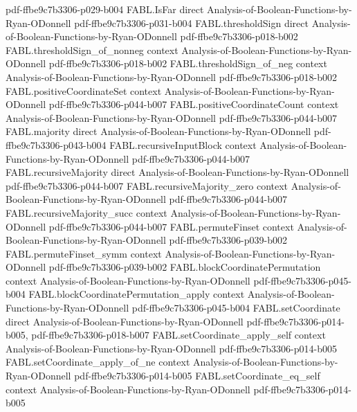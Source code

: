 \begin{theorem}
  {pdf-ffbe9c7b3306-p029-b004}
\proofstep
  {FABL.IsFar}
  {direct}
  {Analysis-of-Boolean-Functions-by-Ryan-ODonnell}
  {pdf-ffbe9c7b3306-p031-b004}
\proofstep
  {FABL.thresholdSign}
  {direct}
  {Analysis-of-Boolean-Functions-by-Ryan-ODonnell}
  {pdf-ffbe9c7b3306-p018-b002}
\proofstep
  {FABL.thresholdSign_of_nonneg}
  {context}
  {Analysis-of-Boolean-Functions-by-Ryan-ODonnell}
  {pdf-ffbe9c7b3306-p018-b002}
\proofstep
  {FABL.thresholdSign_of_neg}
  {context}
  {Analysis-of-Boolean-Functions-by-Ryan-ODonnell}
  {pdf-ffbe9c7b3306-p018-b002}
\proofstep
  {FABL.positiveCoordinateSet}
  {context}
  {Analysis-of-Boolean-Functions-by-Ryan-ODonnell}
  {pdf-ffbe9c7b3306-p044-b007}
\proofstep
  {FABL.positiveCoordinateCount}
  {context}
  {Analysis-of-Boolean-Functions-by-Ryan-ODonnell}
  {pdf-ffbe9c7b3306-p044-b007}
\proofstep
  {FABL.majority}
  {direct}
  {Analysis-of-Boolean-Functions-by-Ryan-ODonnell}
  {pdf-ffbe9c7b3306-p043-b004}
\proofstep
  {FABL.recursiveInputBlock}
  {context}
  {Analysis-of-Boolean-Functions-by-Ryan-ODonnell}
  {pdf-ffbe9c7b3306-p044-b007}
\proofstep
  {FABL.recursiveMajority}
  {direct}
  {Analysis-of-Boolean-Functions-by-Ryan-ODonnell}
  {pdf-ffbe9c7b3306-p044-b007}
\proofstep
  {FABL.recursiveMajority_zero}
  {context}
  {Analysis-of-Boolean-Functions-by-Ryan-ODonnell}
  {pdf-ffbe9c7b3306-p044-b007}
\proofstep
  {FABL.recursiveMajority_succ}
  {context}
  {Analysis-of-Boolean-Functions-by-Ryan-ODonnell}
  {pdf-ffbe9c7b3306-p044-b007}
\proofstep
  {FABL.permuteFinset}
  {context}
  {Analysis-of-Boolean-Functions-by-Ryan-ODonnell}
  {pdf-ffbe9c7b3306-p039-b002}
\proofstep
  {FABL.permuteFinset_symm}
  {context}
  {Analysis-of-Boolean-Functions-by-Ryan-ODonnell}
  {pdf-ffbe9c7b3306-p039-b002}
\proofstep
  {FABL.blockCoordinatePermutation}
  {context}
  {Analysis-of-Boolean-Functions-by-Ryan-ODonnell}
  {pdf-ffbe9c7b3306-p045-b004}
\proofstep
  {FABL.blockCoordinatePermutation_apply}
  {context}
  {Analysis-of-Boolean-Functions-by-Ryan-ODonnell}
  {pdf-ffbe9c7b3306-p045-b004}
\proofstep
  {FABL.setCoordinate}
  {direct}
  {Analysis-of-Boolean-Functions-by-Ryan-ODonnell}
  {pdf-ffbe9c7b3306-p014-b005,
    pdf-ffbe9c7b3306-p018-b007}
\proofstep
  {FABL.setCoordinate_apply_self}
  {context}
  {Analysis-of-Boolean-Functions-by-Ryan-ODonnell}
  {pdf-ffbe9c7b3306-p014-b005}
\proofstep
  {FABL.setCoordinate_apply_of_ne}
  {context}
  {Analysis-of-Boolean-Functions-by-Ryan-ODonnell}
  {pdf-ffbe9c7b3306-p014-b005}
\proofstep
  {FABL.setCoordinate_eq_self}
  {context}
  {Analysis-of-Boolean-Functions-by-Ryan-ODonnell}
  {pdf-ffbe9c7b3306-p014-b005}

\end{theorem}
